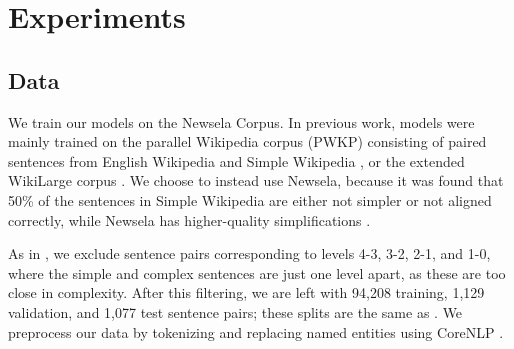 \documentclass[11pt,a4paper]{article}
\begin{document}
\section{Experiments}

\subsection{Data} \label{simpdata}

We train our models on the Newsela Corpus. In previous work, models were mainly trained on the parallel Wikipedia corpus (PWKP) consisting of paired sentences from English Wikipedia and Simple Wikipedia \cite{zhu2010monolingual}, or the extended WikiLarge corpus \cite{zhang2017sentence}. We choose to instead use Newsela, because it was found that 50\% of the sentences in Simple Wikipedia are either not simpler or not aligned correctly, while Newsela has higher-quality simplifications \cite{xu2015problems}.

As in , we exclude sentence pairs corresponding to levels 4-3, 3-2, 2-1, and 1-0, where the simple and complex sentences are just one level apart, as these are too close in complexity. After this filtering, we are left with 94,208 training, 1,129 validation, and 1,077 test sentence pairs; these splits are the same as . We preprocess our data by tokenizing and replacing named entities using CoreNLP \cite{manning2014stanford}. 
\end{document}
